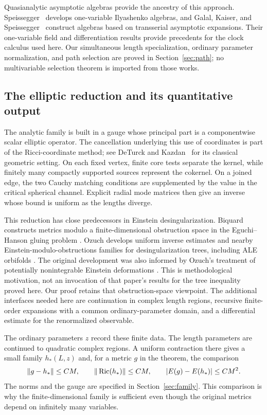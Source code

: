 Quasianalytic asymptotic algebras provide the ancestry of this approach.
Speissegger~\cite{SpeisseggerQA} develops one-variable Ilyashenko
algebras, and Galal, Kaiser, and Speissegger~\cite{GalalKaiserSpeissegger}
construct algebras based on transserial asymptotic expansions. Their
one-variable field and differentiation results provide precedents for
the clock calculus used here. Our simultaneous length specialization, ordinary
parameter normalization, and path selection are proved in
Section~\ref{sec:path}; no multivariable selection theorem is imported
from those works.

\subsection{The elliptic reduction and its quantitative output}

The analytic family is built in a gauge whose principal part is a
componentwise scalar elliptic operator. The cancellation underlying
this use of coordinates is part of the Ricci-coordinate method;
see DeTurck and Kazdan~\cite{DeTurckKazdan1981} for its classical
geometric setting. On each fixed vertex, finite core tests separate
the kernel, while finitely many compactly supported sources represent
the cokernel. On a joined edge, the two Cauchy matching conditions are
supplemented by the value in the critical spherical channel. Explicit
radial mode matrices then give an inverse whose bound is uniform as
the lengths diverge.

This reduction has close predecessors in Einstein desingularization.
Biquard constructs metrics modulo a finite-dimensional obstruction
space in the Eguchi--Hanson gluing problem
\cite[arXiv version, Proposition~8.1]{Biquard2011}.
Ozuch develops uniform inverse estimates and nearby
Einstein-modulo-obstructions families for desingularization trees,
including ALE orbifolds
\cite[arXiv version, Proposition~11 and Theorem~4.6]{Ozuch2022II}.
The original development was also informed by Ozuch's treatment of
potentially nonintegrable Einstein deformations
\cite{Ozuch2021Integrability}. This is methodological motivation, not
an invocation of that paper's results for the tree inequality proved here.
Our proof retains that obstruction-space viewpoint. The additional
interfaces needed here are continuation in complex length regions,
recursive finite-order expansions with a common ordinary-parameter
domain, and a differential estimate for the renormalized observable.

The ordinary parameters $z$ record these finite data. The length
parameters are continued to quadratic complex regions. A uniform
contraction there gives a small family $h_*(L,z)$ and, for a metric
$g$ in the theorem, the comparison
\[
 \|g-h_*\|\le CM,\qquad
 \|\operatorname{Ric}(h_*)\|\le CM,\qquad
 |E(g)-E(h_*)|\le CM^2.
\]
The norms and the gauge are specified in Section~\ref{sec:family}.
This comparison is why the finite-dimensional family is sufficient
even though the original metrics depend on infinitely many variables.


